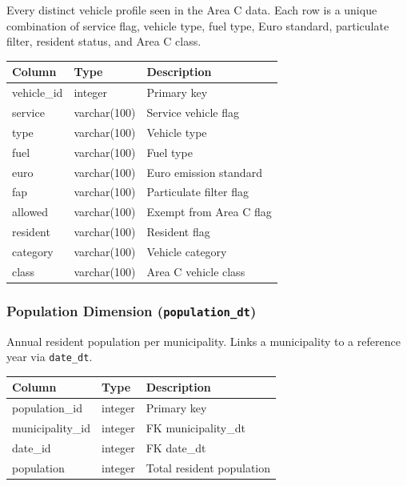 \documentclass{article}
\begin{document}
	Every distinct vehicle profile seen in the Area C data. Each row is a unique combination of service flag, vehicle type, fuel type, Euro standard, particulate filter, resident status, and Area C class.
	\begin{table}[H]
		\centering
		\begin{tabular}{lll}
			\hline
			Column & Type & Description \\
			\hline
			vehicle\_id & integer & Primary key \\
			service & varchar(100) & Service vehicle flag \\
			type & varchar(100) & Vehicle type \\
			fuel & varchar(100) & Fuel type \\
			euro & varchar(100) & Euro emission standard \\
			fap & varchar(100) & Particulate filter flag \\
			allowed & varchar(100) & Exempt from Area C flag \\
			resident & varchar(100) & Resident flag \\
			category & varchar(100) & Vehicle category \\
			class & varchar(100) & Area C vehicle class \\
			\hline
		\end{tabular}
	\end{table}
	
	\subsubsection{Population Dimension (\textbf{\texttt{population\_dt}})}
	
	Annual resident population per municipality. Links a municipality to a reference year via \texttt{date\_dt}.
	\begin{table}[H]
		\centering
		\begin{tabular}{lll}
			\hline
			Column & Type & Description \\
			\hline
			population\_id & integer & Primary key \\
			municipality\_id & integer & FK municipality\_dt \\
			date\_id & integer & FK date\_dt \\
			population & integer & Total resident population \\
			\hline
		\end{tabular}
	\end{table}
	

	\newpage
\end{document}
